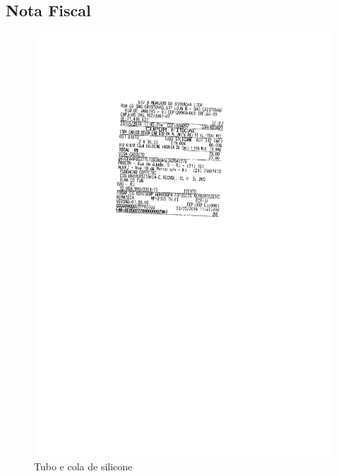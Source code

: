 \subsection{Nota Fiscal}
\begin{figure}[H]
 \centering
 \includegraphics[width=1\columnwidth]{Borracha/nota_borracha.pdf}
 \caption{Tubo e cola de silicone}
 \end{figure} 